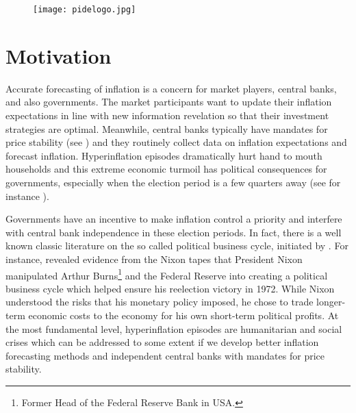 \documentclass[12pt]{article}
\newcommand{\1}{\mathbbm 1}
\begin{document}
		\newpage{}
		
		\begin{figure}[H]
			\begin{center}
				\texttt{[image: pidelogo.jpg]}		
				\caption*{}
			\end{center}
		\end{figure}
		
		\vspace{-8ex}
		
		
		
		\tableofcontents
		
		\newpage{}
		
		\vspace{-8ex}
		
		
		
		
		\section{Motivation}
		
		Accurate forecasting of inflation is a concern for market players, central banks, and also governments. The market participants want to update their inflation expectations in line with new information revelation so that their investment strategies are optimal. Meanwhile, central banks typically have mandates for price stability (see \cite{cukierman1992measuring}) and they routinely collect data on inflation expectations and forecast inflation. Hyperinflation episodes dramatically hurt hand to mouth households and this extreme economic turmoil has political consequences for governments, especially when the election period is a few quarters away (see for instance \cite{binder2021political}). 
		
		Governments have an incentive to make inflation control a priority and interfere with central bank independence in these election periods. In fact, there is a well known classic literature on the so called political business cycle, initiated by \cite{nordhaus1975political}. For instance, \cite{abrams2012political} revealed evidence from the Nixon tapes that President Nixon manipulated Arthur Burns\footnote{Former Head of the Federal Reserve Bank in USA.} and the Federal Reserve into creating a political business cycle which helped ensure his reelection victory in 1972. While Nixon understood the risks that his monetary policy imposed, he chose to trade longer-term economic costs to the economy for his own short-term political profits. At the most fundamental level, hyperinflation episodes are humanitarian and social crises which can be addressed to some extent if we develop better inflation forecasting methods and independent central banks with mandates for price stability.
		
\end{document}
